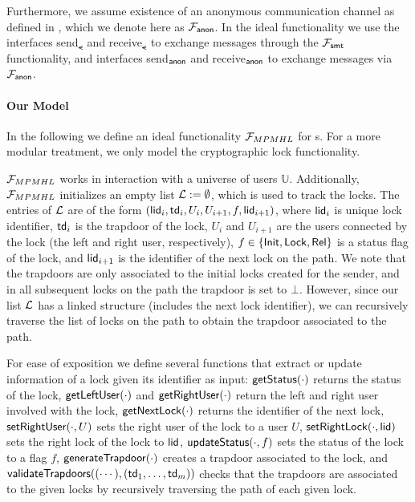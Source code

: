 Furthermore, we assume existence of an anonymous communication channel as defined in 
\cite{cl}, which we denote here as $\mathcal{F}_{\mathsf{anon}}$. In the ideal functionality we use the 
interfaces send$_\smt$ and receive$_\smt$ to exchange messages through the $\mathcal{F}_{\mathsf{smt}}$ 
functionality, and interfaces send$_{\mathsf{anon}}$ and receive$_{\mathsf{anon}}$ to exchange messages via 
$\mathcal{F}_{\mathsf{anon}}$.

\paragraph{Our Model}
In the following we define an ideal functionality $\mathcal{F}_{MPMHL}$ for {\sysname}s. For a 
more modular treatment, we only model the cryptographic lock functionality.


$\mathcal{F}_{MPMHL}$ works in interaction with a universe of users $\mathbb{U}$. Additionally, 
$\mathcal{F}_{MPMHL}$ initializes an empty list $\mathcal{L} := \emptyset$, which is used to track the 
locks. The entries of $\mathcal{L}$ are of the form $(\mathsf{lid}_i, \mathsf{td}_i, U_i, U_{i+1}, f, \\ \mathsf{lid}_{i+1})$, 
where $\mathsf{lid}_i$ is unique lock identifier, $\mathsf{td}_i$ is the trapdoor of the lock, $U_i$ and $U_{i+1}$ 
are the users connected by the lock (the left and right user, respectively), $f \in \{\mathsf{Init},\mathsf{Lock},
\mathsf{Rel}\}$ is a status flag of the lock, and $\mathsf{lid}_{i+1}$ is the identifier of the next lock on the 
path. We note that the trapdoors are only associated to the initial locks created for the sender, 
and in all subsequent locks on the path the trapdoor is set to $\bot$. However, since our list 
$\mathcal{L}$ has a linked structure (includes the next lock identifier), we can recursively traverse the 
list of locks on the path to obtain the trapdoor associated to the path.

For ease of exposition we define several functions that extract or update information of a 
lock given its identifier as input: $\mathsf{getStatus}(\cdot)$ returns the status of the lock, 
$\mathsf{getLeftUser}(\cdot)$ and $\mathsf{getRightUser}(\cdot)$ return the left and right user involved with the 
lock, $\mathsf{getNextLock}(\cdot)$ returns the identifier of the next lock, $\mathsf{setRightUser}(\cdot, U)$ 
sets the right user of the lock to a user $U$, $\mathsf{setRightLock}(\cdot, \mathsf{lid})$ sets the right lock 
of the lock to $\mathsf{lid}$, $\mathsf{updateStatus}(\cdot, f)$ sets the status of the lock to a flag $f$, 
$\mathsf{generateTrapdoor}(\cdot)$ creates a trapdoor associated to the lock, and $\mathsf{validateTrapdoors}
((\cdots), (\mathsf{td}_1,\ldots,\mathsf{td}_m))$ checks that the trapdoors are associated to the given locks 
by recursively traversing the path of each given lock.

